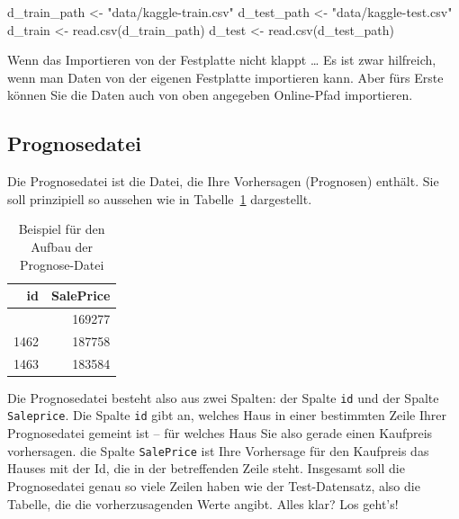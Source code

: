 \documentclass[
  letterpaper,
  oneside,
  open=any]{scrbook}
\newenvironment{Shaded}{\begin{snugshade}}{\end{snugshade}}
\newcommand{\FunctionTok}[1]{\textcolor[rgb]{0.28,0.35,0.67}{#1}}
\newcommand{\NormalTok}[1]{\textcolor[rgb]{0.00,0.23,0.31}{#1}}
\newcommand{\OtherTok}[1]{\textcolor[rgb]{0.00,0.23,0.31}{#1}}
\newcommand{\StringTok}[1]{\textcolor[rgb]{0.13,0.47,0.30}{#1}}
\theoremstyle{definition}
\theoremstyle{definition}
\theoremstyle{definition}
\theoremstyle{remark}
\begin{document}
\begin{Shaded}
\begin{Highlighting}[]
\NormalTok{d\_train\_path }\OtherTok{\textless{}{-}} \StringTok{"data/kaggle{-}train.csv"}
\NormalTok{d\_test\_path }\OtherTok{\textless{}{-}} \StringTok{"data/kaggle{-}test.csv"}
\NormalTok{d\_train }\OtherTok{\textless{}{-}} \FunctionTok{read.csv}\NormalTok{(d\_train\_path)}
\NormalTok{d\_test }\OtherTok{\textless{}{-}} \FunctionTok{read.csv}\NormalTok{(d\_test\_path)}
\end{Highlighting}
\end{Shaded}

Wenn das Importieren von der Festplatte nicht klappt \ldots{} Es ist
zwar hilfreich, wenn man Daten von der eigenen Festplatte importieren
kann. Aber fürs Erste können Sie die Daten auch von oben angegeben
Online-Pfad importieren.

\subsection{Prognosedatei}\label{prognosedatei}

Die Prognosedatei ist die Datei, die Ihre Vorhersagen (Prognosen)
enthält. Sie soll prinzipiell so aussehen wie in Tabelle~\ref{tbl-subm}
dargestellt.

\begin{longtable}[]{@{}rr@{}}

\caption{\label{tbl-subm}Beispiel für den Aufbau der Prognose-Datei}

\tabularnewline

\toprule\noalign{}
id & SalePrice \\
\midrule\noalign{}
\endhead
\bottomrule\noalign{}
\endlastfoot
1461 & 169277 \\
1462 & 187758 \\
1463 & 183584 \\

\end{longtable}

Die Prognosedatei besteht also aus zwei Spalten: der Spalte \texttt{id}
und der Spalte \texttt{Saleprice}. Die Spalte \texttt{id} gibt an,
welches Haus in einer bestimmten Zeile Ihrer Prognosedatei gemeint ist
-- für welches Haus Sie also gerade einen Kaufpreis vorhersagen. die
Spalte \texttt{SalePrice} ist Ihre Vorhersage für den Kaufpreis das
Hauses mit der Id, die in der betreffenden Zeile steht. Insgesamt soll
die Prognosedatei genau so viele Zeilen haben wie der Test-Datensatz,
also die Tabelle, die die vorherzusagenden Werte angibt. Alles klar? Los
geht's!
\end{document}
